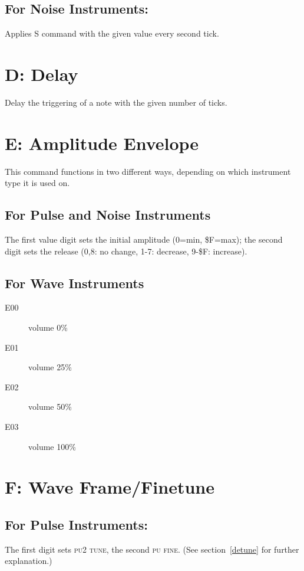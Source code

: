\subsection{For Noise Instruments:}

Applies S command with the given value every second tick.

\section{D: Delay}

Delay the triggering of a note with the given number of ticks.

\section{E: Amplitude Envelope}

This command functions in two different ways, depending on which instrument type it is used on.

\subsection{For Pulse and Noise Instruments}
The first value digit sets the initial amplitude (0=min, \$F=max); the second digit sets the release (0,8: no change, 1-7: decrease, 9-\$F: increase).

\subsection{For Wave Instruments}
\begin{description}
\item[E00] volume 0\%
\item[E01] volume 25\%
\item[E02] volume 50\%
\item[E03] volume 100\%
\end{description}

\section{F: Wave Frame/Finetune}

\subsection{For Pulse Instruments:}
The first digit sets \textsc{pu2 tune}, the second \textsc{pu fine}. (See section~\ref{detune} for further explanation.)

